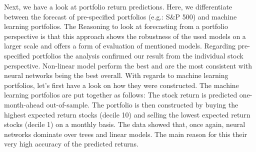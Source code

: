 \newline
Next, we have a look at portfolio return predictions. Here, we differentiate between the forecast of pre-specified portfolios (e.g.: S\&P 500) and machine learning portfolios.
The Reasoning to look at forecasting from a portfolio perspective is that this approach shows the robustness of the used models on a larger scale and offers a form of evaluation of mentioned models.
Regarding pre-specified portfolios the analysis confirmed our result from the individual stock perspective. Non-linear model perform the best and are the most consistent with neural networks being the best overall.
With regards to machine learning portfolios, let’s first have a look on how they were constructed. The machine learning portfolios are put together as follows: The stock return is predicted one-month-ahead out-of-sample. The portfolio is then constructed by buying the highest expected return stocks (decile 10) and selling the lowest expected return stocks (decile 1) on a monthly basis.
The data showed that, once again, neural networks dominate over trees and linear models. The main reason for this their very high accuracy of the predicted returns. 
